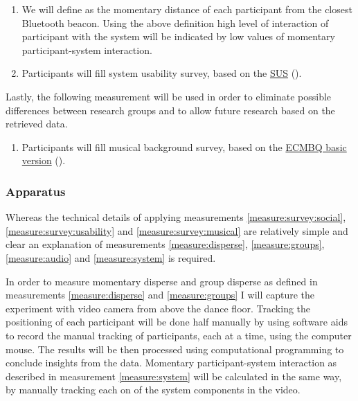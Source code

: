 \begin{enumerate}[resume]
	\item \label{measure:system} We will define  as the momentary distance of each participant from the closest Bluetooth beacon. Using the above definition high level of interaction of participant with the system will be indicated by low values of momentary participant-system interaction.
	\item \label{measure:survey:usability} Participants will fill system usability survey, based on the \href{http://en.wikipedia.org/wiki/System_usability_scale}{SUS} ().
\end{enumerate}
Lastly, the following measurement will be used in order to eliminate possible differences between research groups and to allow future research based on the retrieved data.
\begin{enumerate}[resume]
	\item \label{measure:survey:musical} Participants will fill musical background survey, based on the \href{sites.google.com/site/ecmbqzhao1/simple%20questionnaire.pdf}{ECMBQ basic version} (\todo{finish ref}).
\end{enumerate}

\subsubsection{Apparatus}

Whereas the technical details of applying measurements \ref{measure:survey:social}, \ref{measure:survey:usability} and \ref{measure:survey:musical} are relatively simple and clear an explanation of measurements \ref{measure:disperse}, \ref{measure:groups}, \ref{measure:audio} and \ref{measure:system} is required.

In order to measure momentary disperse and group disperse as defined in measurements \ref{measure:disperse} and \ref{measure:groups} I will capture the experiment with video camera from above the dance floor. Tracking the positioning of each participant will be done half manually by using software aids to record the manual tracking of participants, each at a time, using the computer mouse. The results will be then processed using computational programming to conclude insights from the data. Momentary participant-system interaction as described in measurement \ref{measure:system} will be calculated in the same way, by manually tracking each on of the system components in the video.

